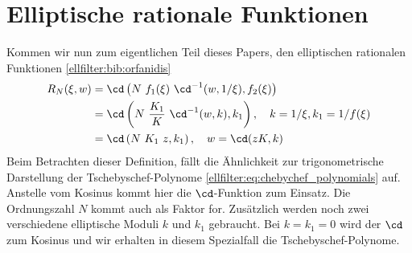 \section{Elliptische rationale Funktionen}

Kommen wir nun zum eigentlichen Teil dieses Papers, den elliptischen rationalen Funktionen \ref{ellfilter:bib:orfanidis}
\begin{align}
    R_N(\xi, w) &= \cd \left(N~f_1(\xi)~\cd^{-1}(w, 1/\xi), f_2(\xi)\right) \label{ellfilter:eq:elliptic}\\
                &= \cd \left(N~\frac{K_1}{K}~\cd^{-1}(w, k), k_1\right) , \quad k= 1/\xi, k_1 = 1/f(\xi) \\
                &= \cd \left(N~K_1~z , k_1 \right), \quad w= \cd(z K, k)
\end{align}
Beim Betrachten dieser Definition, fällt die Ähnlichkeit zur trigonometrische Darstellung der Tsche\-byschef-Polynome \eqref{ellfilter:eq:chebychef_polynomials} auf.
Anstelle vom Kosinus kommt hier die $\cd$-Funktion zum Einsatz.
Die Ordnungszahl $N$ kommt auch als Faktor for.
Zusätzlich werden noch zwei verschiedene elliptische Moduli $k$ und $k_1$ gebraucht.
Bei $k = k_1 = 0$ wird der $\cd$ zum Kosinus und wir erhalten in diesem Spezialfall die Tschebyschef-Polynome.

